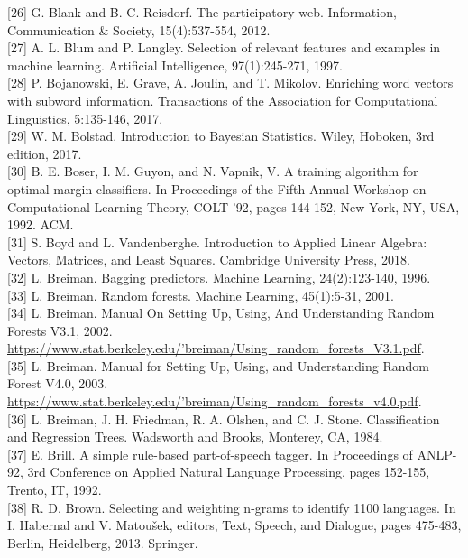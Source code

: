 \documentclass[10pt]{book}
\begin{document}
[26] G. Blank and B. C. Reisdorf. The participatory web. Information, Communication \& Society, 15(4):537-554, 2012.\\[0pt]
[27] A. L. Blum and P. Langley. Selection of relevant features and examples in machine learning. Artificial Intelligence, 97(1):245-271, 1997.\\[0pt]
[28] P. Bojanowski, E. Grave, A. Joulin, and T. Mikolov. Enriching word vectors with subword information. Transactions of the Association for Computational Linguistics, 5:135-146, 2017.\\[0pt]
[29] W. M. Bolstad. Introduction to Bayesian Statistics. Wiley, Hoboken, 3rd edition, 2017.\\[0pt]
[30] B. E. Boser, I. M. Guyon, and N. Vapnik, V. A training algorithm for optimal margin classifiers. In Proceedings of the Fifth Annual Workshop on Computational Learning Theory, COLT '92, pages 144-152, New York, NY, USA, 1992. ACM.\\[0pt]
[31] S. Boyd and L. Vandenberghe. Introduction to Applied Linear Algebra: Vectors, Matrices, and Least Squares. Cambridge University Press, 2018.\\[0pt]
[32] L. Breiman. Bagging predictors. Machine Learning, 24(2):123-140, 1996.\\[0pt]
[33] L. Breiman. Random forests. Machine Learning, 45(1):5-31, 2001.\\[0pt]
[34] L. Breiman. Manual On Setting Up, Using, And Understanding Random Forests V3.1, 2002. \href{https://www.stat.berkeley.edu/'breiman/Using_random_forests_V3.1.pdf}{https://www.stat.berkeley.edu/'breiman/Using\_random\_forests\_V3.1.pdf}.\\[0pt]
[35] L. Breiman. Manual for Setting Up, Using, and Understanding Random Forest V4.0, 2003. \href{https://www.stat.berkeley.edu/'breiman/Using_random_forests_v4.0.pdf}{https://www.stat.berkeley.edu/'breiman/Using\_random\_forests\_v4.0.pdf}.\\[0pt]
[36] L. Breiman, J. H. Friedman, R. A. Olshen, and C. J. Stone. Classification and Regression Trees. Wadsworth and Brooks, Monterey, CA, 1984.\\[0pt]
[37] E. Brill. A simple rule-based part-of-speech tagger. In Proceedings of ANLP-92, 3rd Conference on Applied Natural Language Processing, pages 152-155, Trento, IT, 1992.\\[0pt]
[38] R. D. Brown. Selecting and weighting n-grams to identify 1100 languages. In I. Habernal and V. Matoušek, editors, Text, Speech, and Dialogue, pages 475-483, Berlin, Heidelberg, 2013. Springer.\\[0pt]
\end{document}

